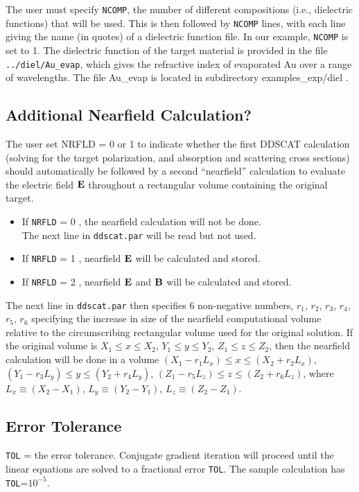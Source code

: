 The user must specify {\tt NCOMP}, the number of
different compositions (i.e., dielectric functions) that will be used.
This is then followed by {\tt NCOMP} lines, with each line giving the name 
(in quotes) of a dielectric function file.  In our example, 
{\tt NCOMP} is set to 1.
The dielectric function of the target material is provided in the file
{\tt ../diel/Au\_evap}, 
which gives the refractive index of evaporated Au
over a range of wavelengths.  The file Au\_evap is located in subdirectory
examples\_exp/diel .


\subsection{ \label{sec:nearfield calc}
            Additional Nearfield Calculation?}
The user set NRFLD = 0 or 1 to indicate whether 
the first DDSCAT calculation (solving for the
target polarization, and absorption and scattering cross sections) should
automatically be followed by a second ``nearfield''
calculation to evaluate the electric field ${\bf E}$
throughout a rectangular volume containing the original target.
\begin{itemize}
\item If {\tt NRFLD} = 0 , the nearfield calculation will not be done.\\
The next line in {\tt ddscat.par} will be read but not used.
\item If {\tt NRFLD} = 1 , nearfield ${\bf E}$ will be calculated and stored.
\item If {\tt NRFLD} = 2 , nearfield ${\bf E}$ and ${\bf B}$ will be calculated and
stored.
\end{itemize}
The next line in {\tt ddscat.par} then specifies 6 non-negative 
numbers, $r_{1}$, $r_{2}$, $r_{3}$, $r_{4}$, $r_{5}$, $r_{6}$
specifying the increase
in size of the nearfield computational volume relative to the circumscribing
rectangular volume used for the original solution.
If the original volume is $X_1\leq x \leq X_2$, $Y_1\leq y\leq Y_2$,
$Z_1\leq z \leq Z_2$, then the nearfield   
calculation will be done in a volume
$(X_1-r_{1}L_x) \leq x \leq (X_2+r_{2}L_x)$,
$(Y_1-r_{3}L_y) \leq y \leq (Y_2+r_{4}L_y)$,
$(Z_1-r_{5}L_z) \leq z \leq (Z_2+r_{6}L_z)$,
where 
$L_x\equiv (X_2-X_1)$,
$L_y\equiv (Y_2-Y_1)$,
$L_z\equiv (Z_2-Z_1)$.

\subsection{ Error Tolerance}
{\tt TOL} = the error tolerance.  Conjugate gradient iteration will proceed
until the linear equations are solved to a fractional error {\tt TOL}.
The sample calculation has {\tt TOL}=$10^{-5}$.

